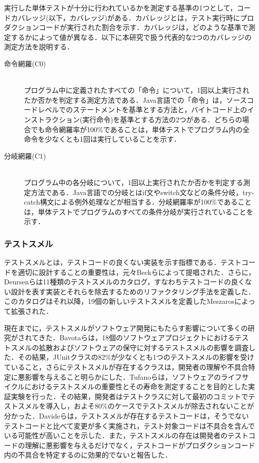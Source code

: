 \documentclass[12pt]{jarticle} %
\begin{document}
実行した単体テストが十分に行われているかを測定する基準の1つとして，コードカバレッジ(以下，カバレッジ)がある．カバレッジとは，テスト実行時にプロダクションコードが実行された割合を示す．カバレッジは，どのような基準で測定するかによって値が異なる．以下に本研究で扱う代表的な2つのカバレッジの測定方法を説明する．

\begin{description}
\item[命令網羅(C0)]~\\
プログラム中に定義されたすべての「命令」について，1回以上実行されたか否かを判定する測定方法である．Java言語での「命令」は，ソースコードレベルでのステートメントを基準とする方法と，バイトコード上のインストラクション(実行命令)を基準とする方法の2つがある．どちらの場合でも命令網羅率が100\%であることは，単体テストでプログラム内の全命令を少なくとも1回は実行していることを示す．
\item[分岐網羅(C1)]~\\
プログラム中の各分岐について，1回以上実行されたか否かを判定する測定方法である．Java言語での分岐とはif文やswitch文などの条件分岐，try-catch構文による例外処理などが相当する．分岐網羅率が100\%であることは，単体テストでプログラムのすべての条件分岐が実行されていることを示す．
\end{description}




\subsubsection{テストスメル}
\label{sec:backtestsmell}



テストスメルとは，テストコードの良くない実装を示す指標である．テストコードを適切に設計することの重要性は，元々Beckら\cite{h1}によって提唱された．さらに，Deursenら\cite{t1}は11種類のテストスメルのカタログ，すなわちテストコードの良くない設計を表す実装とそれらを除去するためのリファクタリング手法を定義した．このカタログはそれ以降，19個の新しいテストスメルを定義したMeszaros\cite{b6}によって拡張された．

現在までに，テストスメルがソフトウェア開発にもたらす影響について多くの研究がされてきた．Bavotaら\cite{Bavota}は，18個のソフトウェアプロジェクトにおけるテストスメルの拡散およびソフトウェアの保守に対するテストスメルの影響を調査した．その結果，JUnitクラスの82\%が少なくとも1つのテストスメルの影響を受けていること，さらにテストスメルが存在するクラスは，開発者の理解や不具合特定に悪影響を与えること明らかにした．Tufanoら\cite{Tufano}は，ソフトウェアのライフサイクルにおけるテストスメルの重要性とその寿命を測定することを目的とした実証実験を行った．その結果，開発者はテストクラスに対して最初のコミットでテストスメルを導入し，およそ80\%のケースでテストスメルが除去されないことが分かった．Davideら\cite{Davide}は，テストスメルが存在するテストコードは，そうでないテストコードと比べて変更が多く実施され，テスト対象コードは不具合を含んでいる可能性が高いことを示した．また，テストスメルの存在は開発者のテストコードの理解に悪影響を与えるだけでなく，テストコードがプロダクションコード内の不具合を特定するのに効果的でないと報告した．
\end{document}
